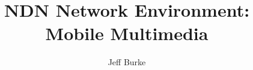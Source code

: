 \documentclass[10pt,onecolumn]{IEEEtran}
\begin{document}
\title{NDN Network Environment: Mobile Multimedia}
\author{Jeff Burke}

\maketitle



















\newpage


\end{document}
